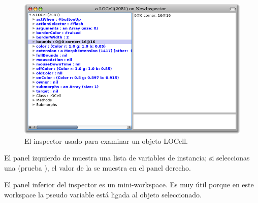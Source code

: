 \documentclass[a4paper,10pt,twoside]{book}
\begin{document}


\begin{figure}[htbp]
   \centering
   \includegraphics[width=\textwidth]{LOCellInspector} 
   \caption{El inspector usado para examinar un objeto LOCell.}
\end{figure}


El panel izquierdo de  muestra una lista de variables de instancia; si seleccionas una (prueba \mbox{}), el valor de la  se muestra en el panel derecho. 


El panel inferior del inspector es un mini-workspace. Es muy \'util porque en este workspace la pseudo variable \self est\'a ligada al objeto seleccionado.
\end{document}

